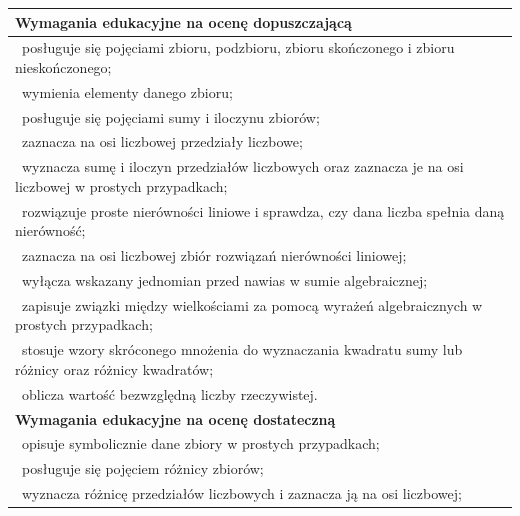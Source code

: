 \documentclass[12pt,a4paper]{article}
\begin{document}
	\begin{longtable}{|p{16cm}|}
		\hline
		\textbf{Wymagania edukacyjne na ocenę dopuszczającą} \\ \hline
		
		\textbullet\ posługuje się pojęciami zbioru, podzbioru, zbioru skończonego i zbioru nieskończonego; \\
		
		\textbullet\ wymienia elementy danego zbioru; \\
		
		\textbullet\ posługuje się pojęciami sumy i iloczynu zbiorów; \\
		
		\textbullet\ zaznacza na osi liczbowej przedziały liczbowe; \\
		
		\textbullet\ wyznacza sumę i iloczyn przedziałów liczbowych oraz zaznacza je na osi liczbowej w prostych przypadkach; \\
		
		\textbullet\ rozwiązuje proste nierówności liniowe i sprawdza, czy dana liczba spełnia daną nierówność; \\
		
		\textbullet\ zaznacza na osi liczbowej zbiór rozwiązań nierówności liniowej; \\
		
		\textbullet\ wyłącza wskazany jednomian przed nawias w sumie algebraicznej; \\
		
		\textbullet\ zapisuje związki między wielkościami za pomocą wyrażeń algebraicznych w prostych przypadkach; \\
		
		\textbullet\ stosuje wzory skróconego mnożenia do wyznaczania kwadratu sumy lub różnicy oraz różnicy kwadratów; \\
		
		\textbullet\ oblicza wartość bezwzględną liczby rzeczywistej. \\ \hline
		
		\textbf{Wymagania edukacyjne na ocenę dostateczną} \\ \hline
		
		\textbullet\ opisuje symbolicznie dane zbiory w prostych przypadkach; \\
		
		\textbullet\ posługuje się pojęciem różnicy zbiorów; \\
		
		\textbullet\ wyznacza różnicę przedziałów liczbowych i zaznacza ją na osi liczbowej; \\
		

\end{longtable}
\end{document}
